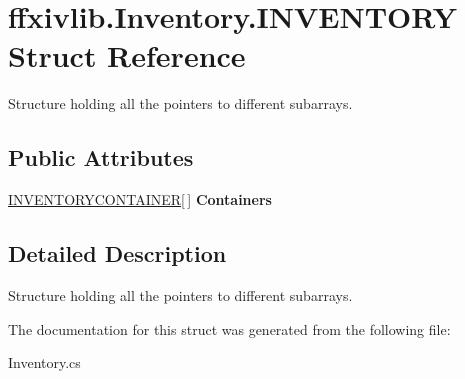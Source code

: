 \hypertarget{structffxivlib_1_1_inventory_1_1_i_n_v_e_n_t_o_r_y}{\section{ffxivlib.\-Inventory.\-I\-N\-V\-E\-N\-T\-O\-R\-Y Struct Reference}
\label{structffxivlib_1_1_inventory_1_1_i_n_v_e_n_t_o_r_y}
}


Structure holding all the pointers to different subarrays.  


\subsection*{Public Attributes}
\begin{DoxyCompactItemize}
\item 
\hypertarget{structffxivlib_1_1_inventory_1_1_i_n_v_e_n_t_o_r_y_a3906f859c58b9cb15f2f3146938648c1}{\hyperlink{structffxivlib_1_1_inventory_1_1_i_n_v_e_n_t_o_r_y_c_o_n_t_a_i_n_e_r}{I\-N\-V\-E\-N\-T\-O\-R\-Y\-C\-O\-N\-T\-A\-I\-N\-E\-R}\mbox{[}$\,$\mbox{]} {\bfseries Containers}}\label{structffxivlib_1_1_inventory_1_1_i_n_v_e_n_t_o_r_y_a3906f859c58b9cb15f2f3146938648c1}

\end{DoxyCompactItemize}


\subsection{Detailed Description}
Structure holding all the pointers to different subarrays. 



The documentation for this struct was generated from the following file\-:\begin{DoxyCompactItemize}
\item 
Inventory.\-cs\end{DoxyCompactItemize}
